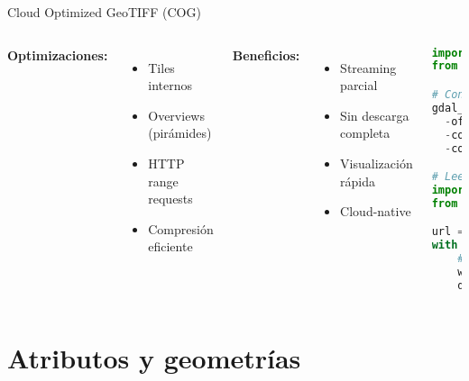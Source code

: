 \documentclass[10pt]{beamer}
\begin{document}
\begin{frame}[fragile]{Cloud Optimized GeoTIFF (COG)}
    \begin{columns}
        \textbf{Optimizaciones:}
        \begin{itemize}
            \item Tiles internos
            \item Overviews (pirámides)
            \item HTTP range requests
            \item Compresión eficiente
        \end{itemize}
        
        \textbf{Beneficios:}
        \begin{itemize}
            \item Streaming parcial
            \item Sin descarga completa
            \item Visualización rápida
            \item Cloud-native
        \end{itemize}
        
        \begin{lstlisting}[language=Python, caption=Crear y leer COG]
import rasterio
from rasterio.crs import CRS

# Convertir a COG
gdal_translate input.tif output_cog.tif \
  -of COG \
  -co COMPRESS=LZW \
  -co BLOCKSIZE=512

# Leer COG desde URL
import rasterio
from rasterio.windows import Window

url = 'https://example.com/cog.tif'
with rasterio.open(url) as src:
    # Leer solo una ventana
    window = Window(0, 0, 512, 512)
    data = src.read(1, window=window)
        \end{lstlisting}
    \end{columns}
\end{frame}

\section{Atributos y geometrías}
\end{document}
